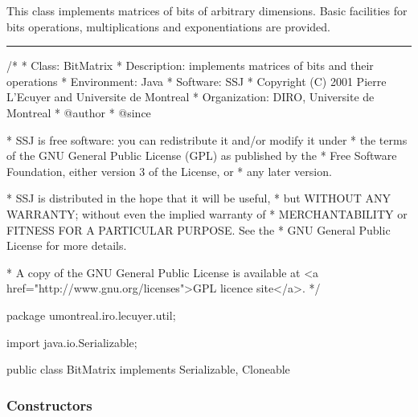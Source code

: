 
This class implements matrices of bits of arbitrary dimensions. Basic
facilities for bits operations, multiplications and exponentiations are
provided.

\bigskip\hrule
\begin{code}
\begin{hide}
/*
 * Class:        BitMatrix
 * Description:  implements matrices of bits and their operations
 * Environment:  Java
 * Software:     SSJ 
 * Copyright (C) 2001  Pierre L'Ecuyer and Universite de Montreal
 * Organization: DIRO, Universite de Montreal
 * @author       
 * @since

 * SSJ is free software: you can redistribute it and/or modify it under
 * the terms of the GNU General Public License (GPL) as published by the
 * Free Software Foundation, either version 3 of the License, or
 * any later version.

 * SSJ is distributed in the hope that it will be useful,
 * but WITHOUT ANY WARRANTY; without even the implied warranty of
 * MERCHANTABILITY or FITNESS FOR A PARTICULAR PURPOSE.  See the
 * GNU General Public License for more details.

 * A copy of the GNU General Public License is available at
   <a href="http://www.gnu.org/licenses">GPL licence site</a>.
 */
\end{hide}
package umontreal.iro.lecuyer.util; \begin{hide}

import java.io.Serializable;
\end{hide}


public class BitMatrix implements Serializable, Cloneable \begin{hide} {

   static final long serialVersionUID = 2472769969919959608L;

   private BitVector[] rows;        //rows vectors

   private int r, c;                //number of rows / columns

 \end{hide}
\end{code}

\subsubsection* {Constructors}

